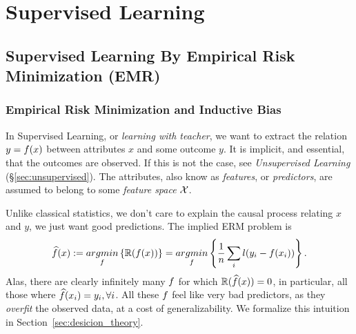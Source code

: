 
\chapter{Supervised Learning}
\label{sec:supervised}

\section{Supervised Learning By Empirical Risk Minimization (EMR)}
\label{sec:learning}



\subsection{Empirical Risk Minimization and Inductive Bias}
In Supervised Learning, or \emph{learning with teacher},  we want to extract the relation $y=f(x)$ between attributes $x$ and some outcome $y$.
It is implicit, and essential, that the outcomes are observed. If this is not the case, see \emph{Unsupervised Learning }(\S\ref{sec:unsupervised}).
The attributes, also know as \emph{features}, or \emph{predictors}, are assumed to belong to some \emph{feature space} $\mathcal{X}$. 

Unlike classical statistics, we don't care to explain the causal process relating $x$ and $y$, we just want good predictions.  The implied ERM problem is
\begin{align}
	\widehat{f}(x) := \mathop{argmin} _{f}\left\{ \mathbb{R}(f(x)) \right\} = \mathop{argmin} _{f}\left\{ \frac{1}{n} \sum_i l(y_i - f(x_i)) \right\}.
\end{align}
Alas, there are clearly infinitely many $f$ for which $\mathbb{R}(\widehat{f}(x))=0$, in particular, all those where $\widehat{f}(x_i)=y_i, \forall i$.
All these $f$ feel like very bad predictors, as they \emph{overfit} the observed data, at a cost of generalizability.
We formalize this intuition in Section~\ref{sec:desicion_theory}. 

